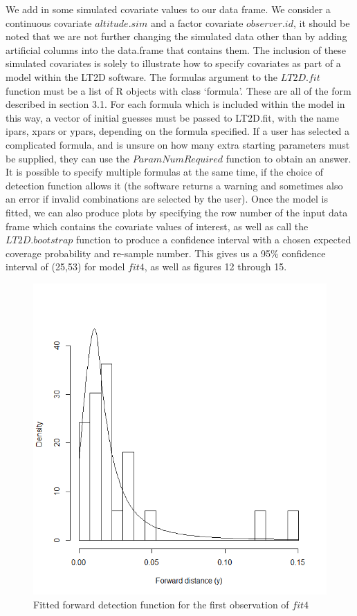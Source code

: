 \documentclass[11pt]{article}
\begin{document}
\begin{multicols}{2}
We add in some simulated covariate values to our data frame. We consider a continuous covariate $altitude.sim$ and a factor covariate $observer.id$, it should be noted that we are not further changing the simulated data other than by adding artificial columns into the data.frame that contains them. The inclusion of these simulated covariates is solely to illustrate how to specify covariates as part of a model within the LT2D software. The formulas argument to the $LT2D.fit$ function must be a list of R objects with class `formula'. These are all of the form described in section 3.1. For each formula which is included within the model in this way, a vector of initial guesses must be passed to LT2D.fit, with the name ipars, xpars or ypars, depending on the formula specified. If a user has selected a complicated formula, and is unsure on how many extra starting parameters must be supplied, they can use the $ParamNumRequired$ function to obtain an answer. It is possible to specify multiple formulas at the same time, if the choice of detection function allows it (the software returns a warning and sometimes also an error if invalid combinations are selected by the user). Once the model is fitted, we can also produce plots by specifying the row number of the input data frame which contains the covariate values of interest, as well as call the $LT2D.bootstrap$ function to produce a confidence interval with a chosen expected coverage probability and re-sample number.
This gives us a 95\% confidence interval of (25,53) for model $fit4$, as well as figures 12 through 15.\\


\begin{figure}[H]
\center
\includegraphics[scale=0.42]{fig13}
\caption{Fitted forward detection function for the first observation of $fit4$}
\end{figure}


\end{multicols}
\end{document}
